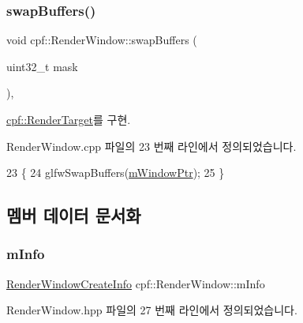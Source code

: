\subsubsection{\texorpdfstring{swap\+Buffers()}{swapBuffers()}}
{\footnotesize\ttfamily void cpf\+::\+Render\+Window\+::swap\+Buffers (\begin{DoxyParamCaption}\item[{uint32\+\_\+t}]{mask }\end{DoxyParamCaption})\hspace{0.3cm}{\ttfamily [override]}, {\ttfamily [virtual]}}



\hyperlink{classcpf_1_1_render_target_aaa9d8d7751c1cc33fbe896600ba0e459}{cpf\+::\+Render\+Target}를 구현.



Render\+Window.\+cpp 파일의 23 번째 라인에서 정의되었습니다.


\begin{DoxyCode}
23                                                 \{
24         glfwSwapBuffers(\hyperlink{classcpf_1_1_render_window_a871b4de6be0b9fa29b9394e38c395a04}{mWindowPtr});
25     \}
\end{DoxyCode}


\subsection{멤버 데이터 문서화}
\mbox{\label{classcpf_1_1_render_window_ad3608b5ed5c1b0c5471f96e5c5199eb0}} 
\subsubsection{\texorpdfstring{m\+Info}{mInfo}}
{\footnotesize\ttfamily \hyperlink{structcpf_1_1_render_window_create_info}{Render\+Window\+Create\+Info} cpf\+::\+Render\+Window\+::m\+Info\hspace{0.3cm}{\ttfamily [private]}}



Render\+Window.\+hpp 파일의 27 번째 라인에서 정의되었습니다.

\mbox{\label{classcpf_1_1_render_window_af4d30f7fd51910725a814828ea9cc33e}} 
